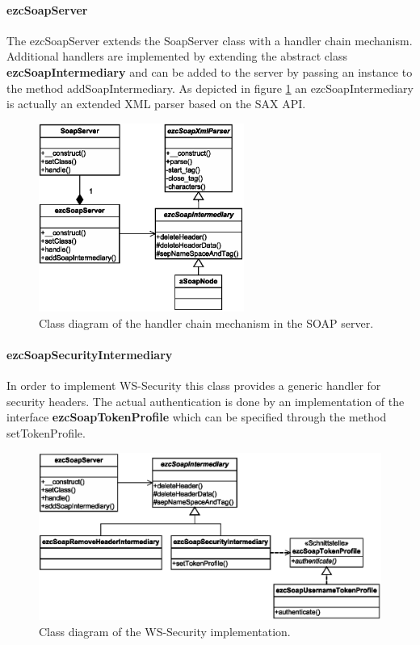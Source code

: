 \documentclass[10pt,final,a4paper,oneside]{article}
\begin{document}
\paragraph{ezcSoapServer}
The ezcSoapServer extends the SoapServer class
with a handler chain mechanism.
Additional handlers are implemented
by extending the abstract class \textbf{ezcSoapIntermediary}
and can be added to the server
by passing an instance to the method addSoapIntermediary.
As depicted in figure \ref{fig:ezcSoapServer.class-diagram}
an ezcSoapIntermediary is actually
an extended XML parser based on the SAX API.

\begin{figure}[htbp]
	\centering
		\includegraphics[width=0.60\textwidth]{figures/ezcSoapServer.class-diagram.eps}
	\caption{Class diagram of the handler chain mechanism in the SOAP server.}
	\label{fig:ezcSoapServer.class-diagram}
\end{figure}

\paragraph{ezcSoapSecurityIntermediary}
In order to implement WS-Security
this class provides a generic handler
for security headers.
The actual authentication is done
by an implementation of the interface
\textbf{ezcSoapTokenProfile}
which can be specified 
through the method setTokenProfile.

\begin{figure}[htbp]
	\centering
		\includegraphics[width=1.00\textwidth]{figures/ezcSoapServer-with-WS-Security.class-diagram.eps}
	\caption{Class diagram of the WS-Security implementation.}
	\label{fig:ezcSoapServer-with-WS-Security.class-diagram}
\end{figure}
\end{document}
